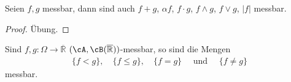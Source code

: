 \marginpar{\textcolor{red}{Vorlesung 9}}

\begin{lemma}\label{hilf}
	Seien $f,g$ messbar, dann sind auch $f+g$, $\alpha f$, $f \cdot g$, $f \land g$, $f \lor g$, $|f|$ messbar.
\end{lemma}

\begin{proof}
	Übung.
\end{proof}

\begin{lemma}
	Sind $f,g \! : \Omega \rightarrow \overline{\mathbb{R}}$ $(\cA, \cB(\overline{\mathbb{R}}))$-messbar, so sind die Mengen 
\begin{align*}
	\{ f < g \},\quad \{ f \leq g \}, \quad \{ f = g \}\quad\text{ und }\quad \{ f \neq g \}
\end{align*}	
	messbar.
\end{lemma}

